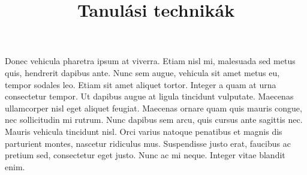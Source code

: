 \documentclass[../Main.tex]{subfiles}
\begin{document}
\title{Tanulási technikák}

Donec vehicula pharetra ipsum at viverra.
Etiam nisl mi, malesuada sed metus quis,
hendrerit dapibus ante. Nunc sem augue,
vehicula sit amet metus eu, tempor sodales leo.
Etiam sit amet aliquet tortor. Integer a quam at urna consectetur tempor.
Ut dapibus augue at ligula tincidunt vulputate.
Maecenas ullamcorper nisl eget aliquet feugiat.
Maecenas ornare quam quis mauris congue, nec sollicitudin mi rutrum.
Nunc dapibus sem arcu, quis cursus ante sagittis nec.
Mauris vehicula tincidunt nisl. Orci varius natoque penatibus et
magnis dis parturient montes, nascetur ridiculus mus. Suspendisse justo erat,
faucibus ac pretium sed, consectetur eget justo. Nunc ac mi neque.
Integer vitae blandit enim.
\end{document}
